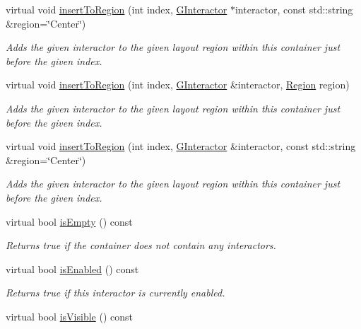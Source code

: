 \begin{DoxyCompactItemize}
virtual void \mbox{\hyperlink{classGContainer_adeeb03feb9346a9cf2046427484c20bc}{insert\+To\+Region}} (int index, \mbox{\hyperlink{classGInteractor}{G\+Interactor}} $\ast$interactor, const std\+::string \&region=\char`\"{}Center\char`\"{})
\begin{DoxyCompactList}\small\item\em Adds the given interactor to the given layout region within this container just before the given index. \end{DoxyCompactList}\item 
virtual void \mbox{\hyperlink{classGContainer_a1be2b263cd8d28e61e136a19d8e935cc}{insert\+To\+Region}} (int index, \mbox{\hyperlink{classGInteractor}{G\+Interactor}} \&interactor, \mbox{\hyperlink{classGContainer_a81a01a86de31071a92e6cce0bab9bc4b}{Region}} region)
\begin{DoxyCompactList}\small\item\em Adds the given interactor to the given layout region within this container just before the given index. \end{DoxyCompactList}\item 
virtual void \mbox{\hyperlink{classGContainer_ad4d413f64a3e4fb948956e7249c10110}{insert\+To\+Region}} (int index, \mbox{\hyperlink{classGInteractor}{G\+Interactor}} \&interactor, const std\+::string \&region=\char`\"{}Center\char`\"{})
\begin{DoxyCompactList}\small\item\em Adds the given interactor to the given layout region within this container just before the given index. \end{DoxyCompactList}\item 
virtual bool \mbox{\hyperlink{classGContainer_acf82f9b2937375c7b1cf3dccb3df3312}{is\+Empty}} () const
\begin{DoxyCompactList}\small\item\em Returns true if the container does not contain any interactors. \end{DoxyCompactList}\item 
virtual bool \mbox{\hyperlink{classGInteractor_aacb819fb241851fd9fc045271baa4034}{is\+Enabled}} () const
\begin{DoxyCompactList}\small\item\em Returns true if this interactor is currently enabled. \end{DoxyCompactList}\item 
virtual bool \mbox{\hyperlink{classGInteractor_a9d8a6cfb13917785c143e74d40e4e2be}{is\+Visible}} () const

\end{DoxyCompactItemize}
